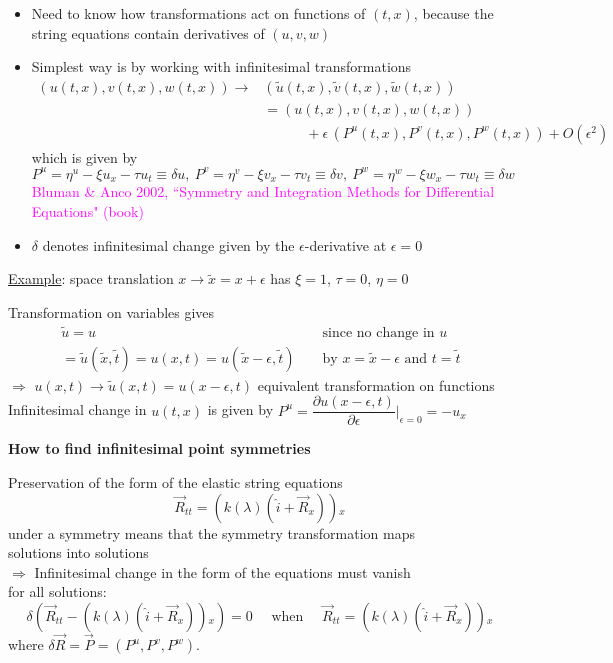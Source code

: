 \documentclass[landscape]{slides}
\def\myref#1{\textcolor{magenta}{\small #1}}
\begin{document}
\begin{itemize}
\item
Need to know how transformations act on functions of $(t,x)$, 
because the string equations contain derivatives of $(u,v,w)$
\item
Simplest way is by working with infinitesimal transformations 
\[\begin{aligned}
(u(t,x),v(t,x),w(t,x)) \to & (\tilde{u}(t,x),\tilde{v}(t,x),\tilde{w}(t,x)) \\
& = (u(t,x),v(t,x),w(t,x)) \\&\qquad\quad
+ \epsilon\, (P^u(t,x),P^v(t,x),P^w(t,x)) + O(\epsilon^2)
\end{aligned}\]
which is given by 
\[
P^u = \eta^u - \xi u_x - \tau u_t \equiv \delta u,
\
P^v = \eta^v - \xi v_x - \tau v_t \equiv \delta v,
\
P^w = \eta^w - \xi w_x - \tau w_t \equiv \delta w
\]
\myref{Bluman \&  Anco 2002, ``Symmetry and Integration Methods for Differential Equations" (book) }
\item
$\delta$ denotes infinitesimal change given by the $\epsilon$-derivative at $\epsilon=0$
\end{itemize}
\hfil

\underline{Example}: space translation $x\to \tilde{x} = x +\epsilon$ 
has $\xi =1$, $\tau=0$, $\eta=0$

Transformation on variables gives
\[\begin{aligned}
& \tilde{u} = u 
&&\text{ since no change in $u$ }\\
& =\tilde{u}(\tilde{x},\tilde{t}) = u(x,t) =u(\tilde{x}-\epsilon,\tilde{t}) 
&&\text{ by $x=\tilde{x} -\epsilon$ and $t=\tilde{t}$ }
\end{aligned}\]
$\Longrightarrow$
$u(x,t) \to \tilde{u}(x,t) = u(x-\epsilon,t)$
equivalent transformation on functions
\\

Infinitesimal change in $u(t,x)$ is given by $P^u = \dfrac{\partial u(x-\epsilon,t)}{\partial \epsilon}\big|_{\epsilon=0} = -u_x$

\newpage

\textbf{How to find infinitesimal point symmetries}

Preservation of the form of the elastic string equations 
\[
\vec{R}_{tt} = ( k(\lambda) (\hat{i} + \vec{R}_x) ){}_x
\]
under a symmetry means that the symmetry transformation maps\\
solutions into solutions
\\

$\Longrightarrow$
Infinitesimal change in the form of the equations must vanish\\
for all solutions:
\[
\delta \left( \vec{R}_{tt} - ( k(\lambda) (\hat{i} + \vec{R}_x) ){}_x \right) 
=0
\quad\text{ when }\quad
\vec{R}_{tt} = ( k(\lambda) (\hat{i} + \vec{R}_x) ){}_x
\]
where $\delta \vec{R} = \vec{P} = (P^u,P^v,P^w)$.
\\
\end{document}
